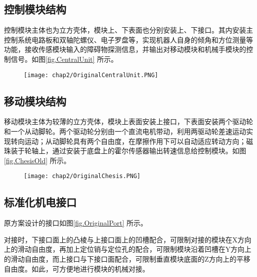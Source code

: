 \subsection{控制模块结构}
控制模块主体也为立方壳体，模块上、下表面也分别安装上、下接口。其内安装主控制系统电路板和双轴陀螺仪、电子罗盘等，实现机器人自身的倾角和方位测量等功能，接收传感模块输入的障碍物探测信息，并输出对移动模块和机械手模块的控制信号。如图\ref{fig.CentralUnit} 所示。
\begin{figure}[!htp]
  \centering
  \texttt{[image: chap2/OriginalCentralUnit.PNG]}
\end{figure}
\subsection{移动模块结构}
移动模块主体为较薄的立方壳体，模块上表面安装上接口，下表面安装两个驱动轮和一个从动脚轮。两个驱动轮分别由一个直流电机带动，利用两驱动轮差速运动实现转向运动；从动脚轮具有两个自由度，在摩擦作用下可以自动适应转动方向；磁珠装于轮轴上，通过安装于底盘上的霍尔传感器输出转速信息给控制模块。如图\ref{fig.ChesisOld} 所示。
\begin{figure}[!htp]
  \centering
  \texttt{[image: chap2/OriginalChesis.PNG]}
\end{figure}
\subsection{标准化机电接口}
原方案设计的接口如图\ref{fig.OriginalPort} 所示。
\begin{figure}
  \centering
\end{figure}
对接时，下接口面上的凸棱与上接口面上的凹槽配合，可限制对接的模块在X方向上的滑动自由度，再加上定位销与定位孔的配合，可限制模块沿着凹槽在Y方向上的滑动自由度，而上接口与下接口面配合，可限制垂直模块底面的Z方向上的平移自由度。如此，可方便地进行模块的机械对接。

